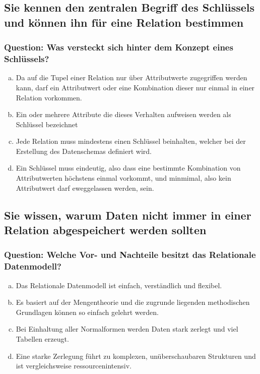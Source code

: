\documentclass{article}
\begin{document}
\begin{adjustwidth}{2em}{2em}
\begin{adjustwidth}{2em}{2em}
			\subsection{Sie kennen den zentralen Begriff des Schlüssels und können ihn für eine Relation bestimmen}
			\begin{adjustwidth}{1em}{}
				\subsubsection*{Question: Was versteckt sich hinter dem Konzept eines Schlüssels?}
				\begin{adjustwidth}{1em}{}
					\begin{enumerate}[(a)]
						\item Da auf die Tupel einer Relation nur über Attributwerte zugegriffen werden kann, darf ein Attributwert oder eine Kombination dieser nur einmal in einer Relation vorkommen.
						\item Ein oder mehrere Attribute die dieses Verhalten aufweisen werden als Schlüssel bezeichnet
						\item Jede Relation muss mindestens einen Schlüssel beinhalten, welcher bei der Erstellung des Datenschemas definiert wird.
						\item Ein Schlüssel muss eindeutig, also dass eine bestimmte Kombination von Attributwerten höchstens einmal vorkommt, und minmimal, also kein Attributwert darf eweggelassen werden, sein.
					\end{enumerate}
				\end{adjustwidth}
			\end{adjustwidth}
			\subsection{Sie wissen, warum Daten nicht immer in einer Relation abgespeichert werden sollten}
			\begin{adjustwidth}{1em}{}
				\subsubsection*{Question: Welche Vor- und Nachteile besitzt das Relationale Datenmodell?}
				\begin{adjustwidth}{1em}{}
					\begin{enumerate}[(a)]
						\item Das Relationale Datenmodell ist einfach, verständlich und flexibel.
						\item Es basiert auf der Mengentheorie und die zugrunde liegenden methodischen Grundlagen können so einfach gelehrt werden.
						\item Bei Einhaltung aller Normalformen werden Daten stark zerlegt und viel Tabellen erzeugt.
						\item Eine starke Zerlegung führt zu komplexen, unüberschaubaren Strukturen und ist vergleichsweise ressourcenintensiv.
					\end{enumerate}
				\end{adjustwidth}
			\end{adjustwidth}

\end{adjustwidth}
\end{adjustwidth}
\end{document}
